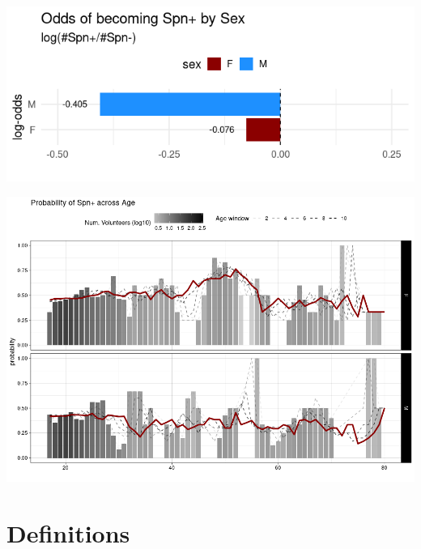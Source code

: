 \documentclass[
]{book}
\begin{document}
\includegraphics[width=9.33in]{images/paste-1F19DB12}

\includegraphics[width=13.33in]{images/paste-986B85C7}

\hypertarget{definitions}{%
\chapter{Definitions}\label{definitions}}
\end{document}
